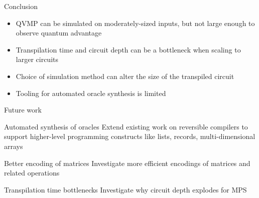 \documentclass[10pt]{beamer}
\begin{document}
\begin{frame}{Conclusion}
  \begin{itemize}
    \item QVMP can be simulated on moderately-sized inputs, but not large
      enough to observe quantum advantage
    \item Transpilation time and circuit depth can be a bottleneck when scaling to larger circuits
    \item Choice of simulation method can alter the size of the transpiled
      circuit
    \item Tooling for automated oracle synthesis is limited
  \end{itemize}
\end{frame}


\begin{frame}{Future work}
  \begin{exampleblock}{Automated synthesis of oracles}
    Extend existing work on reversible compilers to support higher-level
    programming constructs like lists, records, multi-dimensional arrays
  \end{exampleblock}
  \begin{exampleblock}{Better encoding of matrices}
    Investigate more efficient encodings of matrices and related operations
  \end{exampleblock}
  \begin{exampleblock}{Transpilation time bottlenecks}
    Investigate why circuit depth explodes for MPS
  \end{exampleblock}
\end{frame}
\end{document}
